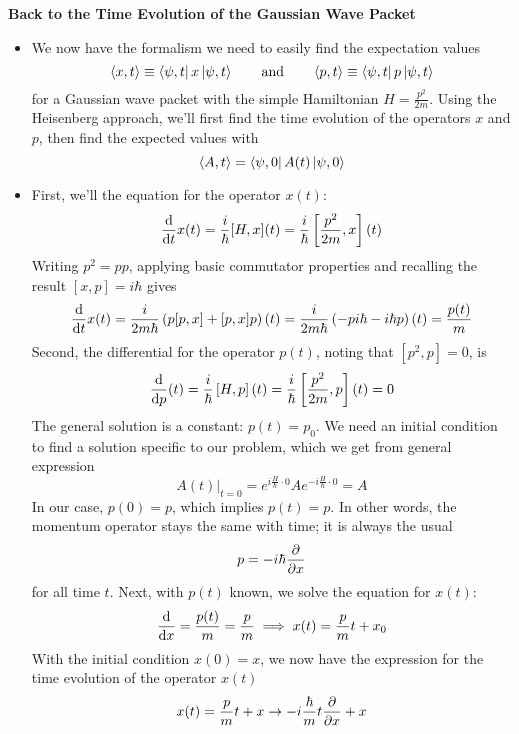 \documentclass[11pt, a4paper]{article}
\newcommand{\eqtext}[1]{\qquad \text{#1} \qquad}
\begin{document}
\textbf{Back to the Time Evolution of the Gaussian Wave Packet}
\begin{itemize}
	\item We now have the formalism we need to easily find the expectation values
	\begin{equation*}
		\ev{x, t} \equiv \bra{\psi, t}x\ket{\psi, t} \eqtext{and} \ev{p, t} \equiv \bra{\psi, t}p\ket{\psi, t}
	\end{equation*}
	for a Gaussian wave packet with the simple Hamiltonian $ H = \frac{p^{2}}{2m} $. Using the Heisenberg approach, we'll first find the time evolution of the operators $ x $ and $ p $, then find the expected values with
	\begin{equation*}
		\ev{A, t} = \bra{\psi, 0} A(t) \ket{\psi, 0}
	\end{equation*}
	
	\item First, we'll  the equation for the operator $ x(t) $:
	\begin{equation*}
		\dv{t}x(t) = \frac{i}{\hbar}[H, x](t) = \frac{i}{\hbar}\left [\frac{p^{2}}{2m}, x\right ](t)
	\end{equation*}
	Writing $ p^{2} = pp $, applying basic commutator properties and recalling the result $ [x, p] = i \hbar $ gives
	\begin{equation*}
		\dv{t}x(t) = \frac{i}{2m\hbar}\left(p[p, x] + [p, x]p\right)(t) = \frac{i}{2m\hbar}\left(-pi\hbar -i\hbar p\right)(t) = \frac{p(t)}{m}
	\end{equation*}
	Second, the differential for the operator $ p(t) $, noting that $ [p^{2}, p] = 0 $, is
	\begin{equation*}
		\dv{p}(t) = \frac{i}{\hbar}\left[H, p\right](t) = \frac{i}{\hbar}\left[\frac{p^{2}}{2m}, p\right](t) = 0
	\end{equation*}
	The general solution is a constant: $ p(t) = p_{0} $. We need an initial condition to find a solution specific to our problem, which we get from general expression
	\begin{equation*}
		A(t)\big |_{t = 0} = e^{i\frac{H}{\hbar}\cdot 0}Ae^{-i\frac{H}{\hbar}\cdot 0} = A
	\end{equation*}
	In our case, $ p(0) = p $, which implies $ p(t) = p$. In other words, the momentum operator stays the same with time; it is always the usual
	\begin{equation*}
		p = -i\hbar \pdv{x}
	\end{equation*}
	for all time $ t $. Next, with $ p(t) $ known, we solve the equation for $ x(t) $:
	\begin{equation*}
		\dv{x} = \frac{p(t)}{m} = \frac{p}{m} \implies x(t) = \frac{p}{m}t + x_{0}
	\end{equation*}
	With the initial condition $ x(0) = x $, we now have the expression for the time evolution of the operator $ x(t) $
	\begin{equation*}
		x(t) = \frac{p}{m}t + x \to -i\frac{\hbar}{m}t\pdv{x} + x
	\end{equation*}
	

\end{itemize}
\end{document}
